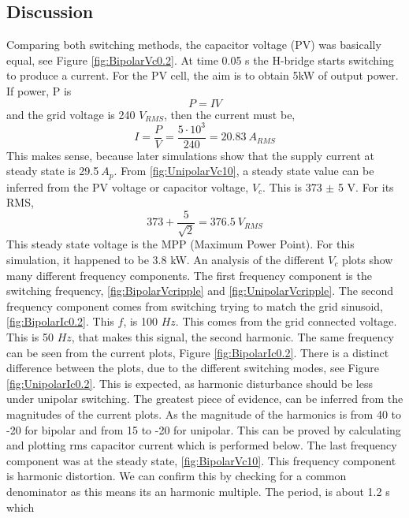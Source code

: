 \documentclass[12pt,twoside]{scrartcl}
\begin{document}
\subsection{Discussion}
Comparing both switching methods, the capacitor voltage (PV) was basically equal, see Figure \ref{fig:BipolarVc0.2}. 
At time 0.05 s the H-bridge starts switching to produce a current. 
For the PV cell, the aim is to obtain 5kW of output power. If power, P is 
\begin{equation}
    P = IV
\end{equation}
and the grid voltage is 240 $V_{RMS}$, then the current must be,
\begin{equation}
    I = \dfrac{P}{V} = \dfrac{5\cdot10^3}{240} = 20.83 \: A_{RMS}
\end{equation}
This makes sense, because later simulations show that 
the supply current at steady state is 29.5$\:A_{p}$. From \ref{fig:UnipolarVc10}, 
a steady state value can be inferred from the PV voltage or capacitor 
voltage, $V_c$. This is 373 $\pm$ 5 V. For its RMS,
\begin{equation}
    373 + \dfrac{5}{\sqrt{2}} = 376.5 \: V_{RMS}
    \label{eq:V_rms}
\end{equation} 
This steady state voltage is the MPP (Maximum Power Point). For this simulation, it happened to be 3.8 kW.
\newline
\newline
\noindent
An analysis of the different $V_c$ plots show many different frequency components.
The first frequency component is the switching frequency, \ref{fig:BipolarVcripple} and \ref{fig:UnipolarVcripple}.
The second frequency component comes from switching trying to match the grid sinusoid, \ref{fig:BipolarIc0.2}. This $f$, is 100 $Hz$. This comes 
from the grid connected voltage. This is 50 $Hz$,
that makes this signal, the second harmonic. The same frequency can 
be seen from the current plots, Figure \ref{fig:BipolarIc0.2}.
There is a distinct difference between the plots, due to the different switching modes, 
see Figure \ref{fig:UnipolarIc0.2}. This is expected, as 
harmonic disturbance should be less under unipolar switching. The greatest piece of 
evidence, can be inferred from the magnitudes of the current plots. 
As the magnitude of the harmonics is from 40 to -20
for bipolar and from 15 to -20 for unipolar. This can be proved by 
calculating and plotting rms capacitor current which is performed below. The last
frequency component was at the steady state, \ref{fig:BipolarVc10}. This frequency component 
is harmonic distortion. We can confirm this by checking for a common denominator as this means its an harmonic multiple. The period, is about 1.2 s which 
\end{document}
